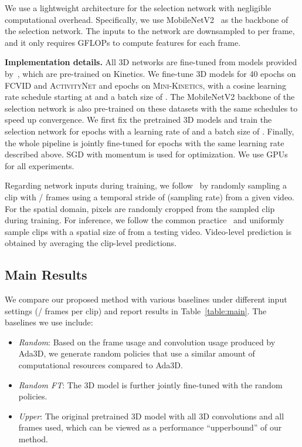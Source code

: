 \documentclass[final]{cvpr}
\newcommand{\anet}{{\scshape ActivityNet}\xspace}
\newcommand{\fcvid}{{\scshape FCVID}\xspace}
\newcommand{\minik}{{\scshape Mini-Kinetics}\xspace}
\newcommand{\system}{{Ada3D}\xspace}
\begin{document}
We use a lightweight architecture for the selection network with negligible computational overhead. Specifically, we use MobileNetV2~\cite{mobilenetv2} as the backbone of the selection network. The inputs to the network are downsampled to  per frame, and it only requires  GFLOPs to compute features for each frame.

\vspace{0.05in}
\noindent\textbf{Implementation details.}
All 3D networks are fine-tuned from models provided by~\cite{slowfast_repo}, which are pre-trained on Kinetics. We fine-tune 3D models for 40 epochs on \fcvid and \anet and  epochs on \minik, with a cosine learning rate schedule starting at  and a batch size of . The MobileNetV2 backbone of the selection network is also pre-trained on these datasets with the same schedules to speed up convergence. We first fix the pretrained 3D models and train the selection network for  epochs with a learning rate of  and a batch size of . Finally, the whole pipeline is jointly fine-tuned for  epochs with the same learning rate described above. SGD with momentum  is used for optimization. We use  GPUs for all experiments. 

Regarding network inputs during training, we follow~\cite{slowfast,x3d} by randomly sampling a clip with / frames using a temporal stride of  (sampling rate) from a given video. For the spatial domain,  pixels are randomly cropped from the sampled clip during training. For inference, we follow the common practice~\cite{slowfast,x3d,nonlocal} and uniformly sample  clips with a spatial size of  from a testing video. Video-level prediction is obtained by averaging the clip-level predictions.

\subsection{Main Results}
We compare our proposed method with various baselines under different input settings (/ frames per clip) and report results in Table~\ref{table:main}. The baselines we use include:
\begin{itemize} \itemsep0.1em
    \item \emph{Random}: Based on the frame usage and convolution usage produced by \system, we generate random policies that use a similar amount of computational resources compared to \system.    
    \item \emph{Random FT}: The 3D model is further jointly fine-tuned with the random policies.
    \item \emph{Upper}: The original pretrained 3D model with all 3D convolutions and all frames used, which can be viewed as a performance ``upperbound'' of our method.
\end{itemize}
\end{document}
